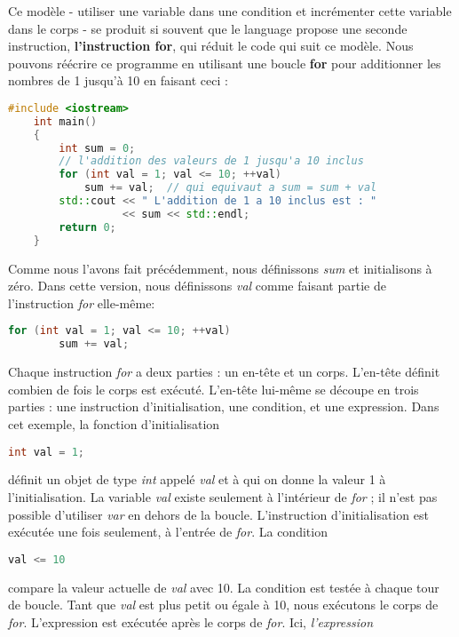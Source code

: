 Ce modèle - utiliser une variable dans une condition et incrémenter cette variable dans le corps - se produit si souvent que le language propose une seconde instruction, \textbf{l'instruction for}, qui réduit le code qui suit ce modèle. Nous pouvons réécrire ce programme en utilisant une boucle \textbf{for} pour additionner les nombres de 1 jusqu'à 10 en faisant ceci :

\medbreak
\begin{lstlisting}[language=C++]
	#include <iostream>
	int main()
	{
		int sum = 0;
		// l'addition des valeurs de 1 jusqu'a 10 inclus
		for (int val = 1; val <= 10; ++val)
			sum += val;  // qui equivaut a sum = sum + val
		std::cout << " L'addition de 1 a 10 inclus est : "
				  << sum << std::endl;
		return 0;
	}
\end{lstlisting}
\medbreak

Comme nous l'avons fait précédemment, nous définissons \textit{sum} et initialisons à zéro. Dans cette version, nous définissons \textit{val} comme faisant partie de l'instruction \textit{for} elle-même:

\medbreak
\begin{lstlisting}[language=C++]
	for (int val = 1; val <= 10; ++val)
		sum += val;
\end{lstlisting}
\medbreak

Chaque instruction \textit{for} a deux parties : un en-tête et un corps. L'en-tête définit combien de fois le corps est exécuté. L'en-tête lui-même se découpe en trois parties : une instruction d'initialisation, une condition, et une expression. Dans cet exemple, la fonction d'initialisation

\medbreak
\begin{lstlisting}[language=C++]
	int val = 1;
\end{lstlisting}
\medbreak

définit un objet de type \textit{int} appelé \textit{val} et à qui on donne la valeur 1 à l'initialisation. La variable \textit{val} existe seulement à l'intérieur de \textit{for} ; il n'est pas possible d'utiliser \textit{var} en dehors de la boucle. L'instruction d'initialisation est exécutée une fois seulement, à l'entrée de \textit{for}. La condition

\medbreak
\begin{lstlisting}[language=C++]
	val <= 10
\end{lstlisting}
\medbreak

compare la valeur actuelle de \textit{val} avec 10. La condition est testée à chaque tour de boucle. Tant que \textit{val} est plus petit ou égale à 10, nous exécutons le corps de \textit{for}. L'expression est exécutée après le corps de \textit{for}. Ici, \textit{l'expression}

